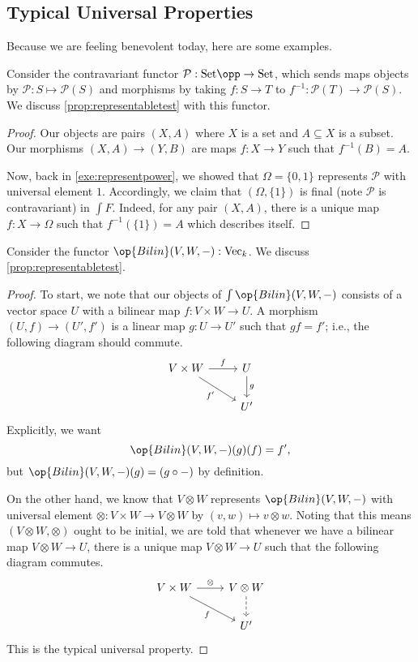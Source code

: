 \subsection{Typical Universal Properties}
Because we are feeling benevolent today, here are some examples.
\begin{exe}
	Consider the contravariant functor $\mathcal P:\mathrm{Set}\opp\to\mathrm{Set}$, which sends maps objects by $\mathcal P:S\mapsto\mathcal P(S)$ and morphisms by taking $f:S\to T$ to $f^{-1}:\mathcal P(T)\to\mathcal P(S)$. We discuss \autoref{prop:representabletest} with this functor.
\end{exe}
\begin{proof}
	Our objects are pairs $(X,A)$ where $X$ is a set and $A\subseteq X$ is a subset. Our morphisms $(X,A)\to(Y,B)$ are maps $f:X\to Y$ such that $f^{-1}(B)=A$.

	Now, back in \autoref{exe:representpower}, we showed that $\Omega=\{0,1\}$ represents $\mathcal P$ with universal element $1$. Accordingly, we claim that $(\Omega,\{1\})$ is final (note $\mathcal P$ is contravariant) in $\int F$. Indeed, for any pair $(X,A)$, there is a unique map $f:X\to\Omega$ such that $f^{-1}(\{1\})=A$ which describes itself.
\end{proof}
\begin{exe}
	Consider the functor $\op{Bilin}(V,W,-):\mathrm{Vec}_k$. We discuss \autoref{prop:representabletest}.
\end{exe}
\begin{proof}
	To start, we note that our objects of $\int\op{Bilin}(V,W,-)$ consists of a vector space $U$ with a bilinear map $f:V\times W\to U$. A morphism $(U,f)\to(U',f')$ is a linear map $g:U\to U'$ such that $gf=f'$; i.e., the following diagram should commute.
	\[\begin{tikzcd}
		{V\times W} & U \\
		& {U'}
		\arrow["f", from=1-1, to=1-2]
		\arrow["{f'}"', from=1-1, to=2-2]
		\arrow["g", from=1-2, to=2-2]
	\end{tikzcd}\]
	Explicitly, we want
	\[\op{Bilin}(V,W,-)(g)(f)=f',\]
	but $\op{Bilin}(V,W,-)(g)=(g\circ-)$ by definition.

	On the other hand, we know that $V\otimes W$ represents $\op{Bilin}(V,W,-)$ with universal element $\otimes:V\times W\to V\otimes W$ by $(v,w)\mapsto v\otimes w$. Noting that this means $(V\otimes W,\otimes)$ ought to be initial, we are told that whenever we have a bilinear map $V\otimes W\to U$, there is a unique map $V\otimes W\to U$ such that the following diagram commutes.
	\[\begin{tikzcd}
		{V\times W} & {V\otimes W} \\
		& {U'}
		\arrow["f"', from=1-1, to=2-2]
		\arrow[dashed, from=1-2, to=2-2]
		\arrow["\otimes", from=1-1, to=1-2]
	\end{tikzcd}\]
	This is the typical universal property.
\end{proof}
